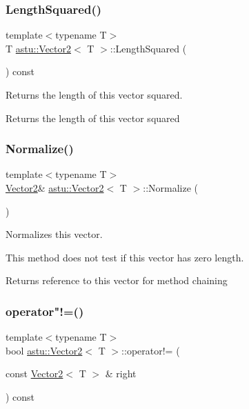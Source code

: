 \subsubsection{\texorpdfstring{Length\+Squared()}{LengthSquared()}\hspace{0.1cm}{\footnotesize\ttfamily [2/2]}}
{\footnotesize\ttfamily template$<$typename T$>$ \\
T \hyperlink{classastu_1_1Vector2}{astu\+::\+Vector2}$<$ T $>$\+::Length\+Squared (\begin{DoxyParamCaption}{ }\end{DoxyParamCaption}) const\hspace{0.3cm}{\ttfamily [inline]}}

Returns the length of this vector squared.

\begin{DoxyReturn}{Returns}
the length of this vector squared 
\end{DoxyReturn}
\mbox{\label{classastu_1_1Vector2_aedecfe4d0a04bb6e3b6dd94caa16e911}} 
\subsubsection{\texorpdfstring{Normalize()}{Normalize()}}
{\footnotesize\ttfamily template$<$typename T$>$ \\
\hyperlink{classastu_1_1Vector2}{Vector2}\& \hyperlink{classastu_1_1Vector2}{astu\+::\+Vector2}$<$ T $>$\+::Normalize (\begin{DoxyParamCaption}{ }\end{DoxyParamCaption})\hspace{0.3cm}{\ttfamily [inline]}}

Normalizes this vector.

This method does not test if this vector has zero length.

\begin{DoxyReturn}{Returns}
reference to this vector for method chaining 
\end{DoxyReturn}
\mbox{\label{classastu_1_1Vector2_a01b57021e1b027997ecefb3c9b3595d9}} 
\subsubsection{\texorpdfstring{operator"!=()}{operator!=()}}
{\footnotesize\ttfamily template$<$typename T$>$ \\
bool \hyperlink{classastu_1_1Vector2}{astu\+::\+Vector2}$<$ T $>$\+::operator!= (\begin{DoxyParamCaption}\item[{const \hyperlink{classastu_1_1Vector2}{Vector2}$<$ T $>$ \&}]{right }\end{DoxyParamCaption}) const\hspace{0.3cm}{\ttfamily [inline]}}

